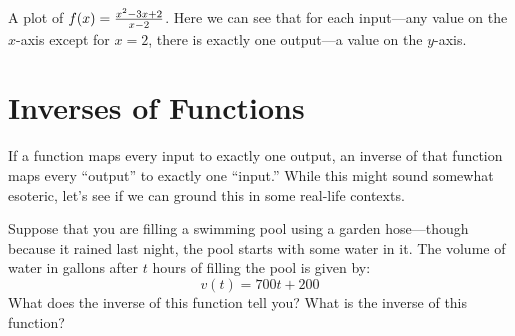 \begin{marginfigure}[0in]
\caption{A plot of $f(x)=\protect\frac{x^2 - 3x + 2}{x-2}$. Here we
  can see that for each input---any value on the $x$-axis except for
  $x=2$, there is exactly one output---a value on the $y$-axis.}
\label{plot:point undfed fxn}
\end{marginfigure}


\begin{exercises}

\begin{exercise} 
\begin{answer}
\end{answer}
\end{exercise}

\end{exercises}








\section{Inverses of Functions}


If a function maps every input to exactly one output, an inverse of that
function maps every ``output'' to exactly one ``input.'' While this
might sound somewhat esoteric, let's see if we can ground this in
some real-life contexts.

\begin{example}
Suppose that you are filling a swimming pool using a garden
hose---though because it rained last night, the pool starts with some
water in it. The volume of water in gallons after $t$ hours of
filling the pool is given by:
\[
v(t) = 700t + 200
\]
What does the inverse of this function tell you? What is the inverse
of this function?
\end{example}


